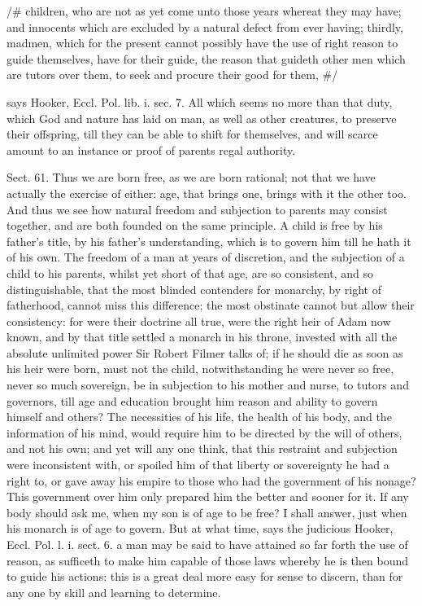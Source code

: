 \documentclass[11pt,openany]{book}
\begin{document}
/\# children, who are not as yet come unto those years whereat they may have; and innocents which are excluded by a natural defect from ever having; thirdly, madmen, which for the present cannot possibly have the use of right reason to guide themselves, have for their guide, the reason that guideth other men which are tutors over them, to seek and procure their good for them, \#/

says Hooker, Eccl. Pol. lib. i. sec. 7. All which seems no more than that duty, which God and nature has laid on man, as well as other creatures, to preserve their offspring, till they can be able to shift for themselves, and will scarce amount to an instance or proof of parents regal authority.

Sect. 61. Thus we are born free, as we are born rational; not that we have actually the exercise of either: age, that brings one, brings with it the other too. And thus we see how natural freedom and subjection to parents may consist together, and are both founded on the same principle. A child is free by his father's title, by his father's understanding, which is to govern him till he hath it of his own. The freedom of a man at years of discretion, and the subjection of a child to his parents, whilst yet short of that age, are so consistent, and so distinguishable, that the most blinded contenders for monarchy, by right of fatherhood, cannot miss this difference; the most obstinate cannot but allow their consistency: for were their doctrine all true, were the right heir of Adam now known, and by that title settled a monarch in his throne, invested with all the absolute unlimited power Sir Robert Filmer talks of; if he should die as soon as his heir were born, must not the child, notwithstanding he were never so free, never so much sovereign, be in subjection to his mother and nurse, to tutors and governors, till age and education brought him reason and ability to govern himself and others? The necessities of his life, the health of his body, and the information of his mind, would require him to be directed by the will of others, and not his own; and yet will any one think, that this restraint and subjection were inconsistent with, or spoiled him of that liberty or sovereignty he had a right to, or gave away his empire to those who had the government of his nonage? This government over him only prepared him the better and sooner for it. If any body should ask me, when my son is of age to be free? I shall answer, just when his monarch is of age to govern. But at what time, says the judicious Hooker, Eccl. Pol. l. i. sect. 6. a man may be said to have attained so far forth the use of reason, as sufficeth to make him capable of those laws whereby he is then bound to guide his actions: this is a great deal more easy for sense to discern, than for any one by skill and learning to determine.
\end{document}

